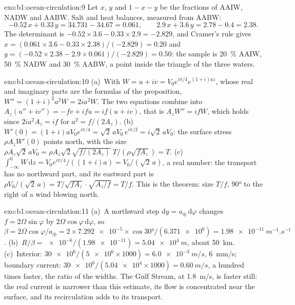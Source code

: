 \begin{solution}{exo:b1:ocean-circulation:9}
Let $x$, $y$ and $1 - x - y$ be the fractions of AAIW, NADW and AABW. Salt and heat
balances, measured from AABW:
\[
  -0.52\,x + 0.33\,y = 34.731 - 34.67 = 0.061,\qquad
  2.9\,x + 3.6\,y = 2.78 - 0.4 = 2.38 .
\]
The determinant is $-0.52 \times 3.6 - 0.33 \times 2.9 = -2.829$, and Cramer's rule
gives $x = (0.061 \times 3.6 - 0.33 \times 2.38)/(-2.829) = 0.20$ and $y = (-0.52
\times 2.38 - 2.9 \times 0.061)/(-2.829) = 0.50$: the sample is \qty{20}{\percent}
AAIW, \qty{50}{\percent} NADW and \qty{30}{\percent} AABW, a point inside the
triangle of the three waters.
\end{solution}

\begin{solution}{exo:b1:ocean-circulation:10}
(a)~With $W = u + iv = V_0e^{i\pi/4}e^{(1+i)az}$, whose real and imaginary parts are
the formulas of the proposition, $W'' = (1+i)^2a^2W = 2ia^2W$. The two equations
combine into $A_z(u'' + iv'') = -fv + ifu = if(u + iv)$, that is $A_zW'' = ifW$,
which holds since $2ia^2A_z = if$ for $a^2 = f/(2A_z)$. (b)~$W'(0) =
(1+i)aV_0e^{i\pi/4} = \sqrt2\,aV_0\,e^{i\pi/2} = i\sqrt2\,aV_0$: the surface stress
$\rho A_zW'(0)$ points north, with the size $\rho A_z\sqrt2\,aV_0 = \rho A_z\sqrt2
\sqrt{f/(2A_z)}\;T/(\rho\sqrt{fA_z}) = T$. (c)~$\int_{-\infty}^0 W\,\mathrm dz =
V_0e^{i\pi/4}/((1+i)a) = V_0/(\sqrt2\,a)$, a real number: the transport has no
northward part, and its eastward part is $\rho V_0/(\sqrt2\,a) =
T/\sqrt{fA_z}\cdot\sqrt{A_z/f} = T/f$. This is the theorem: size $T/f$, \ang{90} to
the right of a wind blowing north.
\end{solution}

\begin{solution}{exo:b1:ocean-circulation:11}
(a)~A northward step $\mathrm dy = a_\oplus\,\mathrm d\varphi$ changes $f = 2\Omega
\sin\varphi$ by $2\Omega\cos\varphi\,\mathrm d\varphi$, so $\beta = 2\Omega
\cos\varphi/a_\oplus = 2 \times \num{7.292e-5} \times \cos\ang{30}/(\num{6.371e6}) =
\qty{1.98e-11}{m^{-1}.s^{-1}}$. (b)~$R/\beta = \num{e-6}/(\num{1.98e-11}) =
\qty{5.04e4}{m}$, about \qty{50}{km}. (c)~Interior: $\num{30e6}/(\num{5e6} \times
1000) = \qty{6.0e-3}{m/s}$, \qty{6}{mm/s}; boundary current: $\num{30e6}/(\num{5.04e4}
\times 1000) = \qty{0.60}{m/s}$, a hundred times faster, the ratio of the widths. The
Gulf Stream, at \qty{1.8}{m/s}, is faster still: the real current is narrower than
this estimate, its flow is concentrated near the surface, and its recirculation adds
to its transport.
\end{solution}

